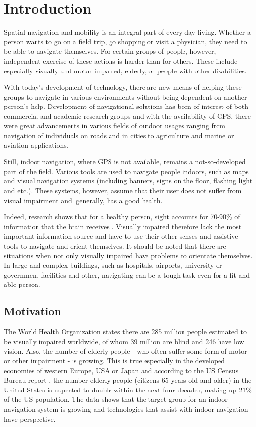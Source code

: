 \chapter{Introduction}
Spatial navigation and mobility is an integral part of every day living. Whether a person wants to go on a field trip, go shopping or visit a physician, they need to be able to navigate themselves. For certain groups of people, however, independent exercise of these actions is harder than for others. These include especially visually and motor impaired, elderly, or people with other disabilities.

With today's development of technology, there are new means of helping these groups to navigate in various environments without being dependent on another person's help. Development of navigational solutions has been of interest of both commercial and academic research groups and with the availability of GPS, there were great advancements in various fields of outdoor usages ranging from navigation of individuals on roads and in cities to agriculture and marine or aviation applications.

Still, indoor navigation, where GPS is not available, remains a not-so-developed part of the field. Various tools are used to navigate people indoors, such as maps and visual navigation systems (including banners, signs on the floor, flashing light and etc.). These systems, however, assume that their user does not suffer from visual impairment and, generally, has a good health.

Indeed, research shows that for a healthy person, sight accounts for 70-90\% of information that the brain receives \cite{hyerle}. Visually impaired therefore lack the most important information source and have to use their other senses and assistive tools to navigate and orient themselves. It should be noted that there are situations when not only visually impaired have problems to orientate themselves. In large and complex buildings, such as hospitals, airports, university or government facilities and other, navigating can be a tough task even for a fit and able person. 

\section{Motivation}
The World Health Organization states there are 285 million people estimated to be visually impaired worldwide, of whom 39 million are blind and 246 have low vision. Also, the number of elderly people - who often suffer some form of motor or other impairment - is growing. This is true especially in the developed economies of western Europe, USA or Japan and according to the US Census Bureau report \cite{uscensus}, the number elderly people (citizens 65-years-old and older) in the United States is expected to double within the next four decades, making up 21\% of the US population. The data shows that the target-group for an indoor navigation system is growing and technologies that assist with indoor navigation have perspective.\\


